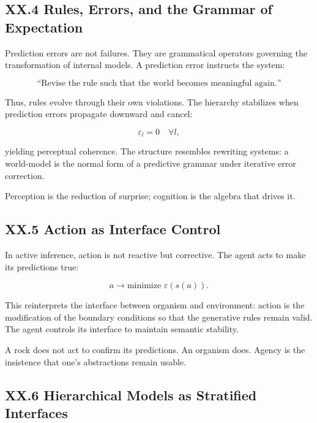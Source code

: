 \documentclass[12pt,letterpaper]{article}
\begin{document}
\subsection{XX.4 Rules, Errors, and the Grammar of Expectation}

Prediction errors are not failures. They are grammatical operators governing the transformation of internal models.  
A prediction error instructs the system:

\[
\text{“Revise the rule such that the world becomes meaningful again.”}
\]

Thus, rules evolve through their own violations.  
The hierarchy stabilizes when prediction errors propagate downward and cancel:

\[
\varepsilon_l = 0 \quad \forall l,
\]

yielding perceptual coherence.  
The structure resembles rewriting systems: a world-model is the normal form of a predictive grammar under iterative error correction.

Perception is the reduction of surprise; cognition is the algebra that drives it.

\subsection{XX.5 Action as Interface Control}

In active inference, action is not reactive but corrective. The agent acts to make its predictions true:

\[
a \to \text{minimize } \varepsilon(s(a)).
\]

This reinterprets the interface between organism and environment:  
action is the modification of the boundary conditions so that the generative rules remain valid.  
The agent controls its interface to maintain semantic stability.

A rock does not act to confirm its predictions.  
An organism does.  
Agency is the insistence that one’s abstractions remain usable.

\subsection{XX.6 Hierarchical Models as Stratified Interfaces}
\end{document}

